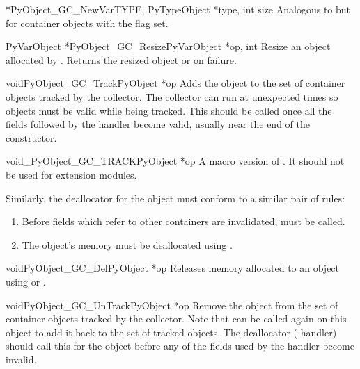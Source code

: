 \begin{cfuncdesc}{*}{PyObject_GC_NewVar}{TYPE, PyTypeObject *type,
                                                   int size}
  Analogous to  but for container objects
  with the  flag set.
\end{cfuncdesc}

\begin{cfuncdesc}{PyVarObject *}{PyObject_GC_Resize}{PyVarObject *op, int}
  Resize an object allocated by .  Returns
  the resized object or \NULL{} on failure.
\end{cfuncdesc}

\begin{cfuncdesc}{void}{PyObject_GC_Track}{PyObject *op}
  Adds the object  to the set of container objects tracked by
  the collector.  The collector can run at unexpected times so objects
  must be valid while being tracked.  This should be called once all
  the fields followed by the  handler become valid,
  usually near the end of the constructor.
\end{cfuncdesc}

\begin{cfuncdesc}{void}{_PyObject_GC_TRACK}{PyObject *op}
  A macro version of .  It should not be
  used for extension modules.
\end{cfuncdesc}

Similarly, the deallocator for the object must conform to a similar
pair of rules:

\begin{enumerate}
\item  Before fields which refer to other containers are invalidated,
        must be called.

\item  The object's memory must be deallocated using
       .
\end{enumerate}

\begin{cfuncdesc}{void}{PyObject_GC_Del}{PyObject *op}
  Releases memory allocated to an object using
   or .
\end{cfuncdesc}

\begin{cfuncdesc}{void}{PyObject_GC_UnTrack}{PyObject *op}
  Remove the object  from the set of container objects tracked
  by the collector.  Note that  can be
  called again on this object to add it back to the set of tracked
  objects.  The deallocator ( handler) should call
  this for the object before any of the fields used by the
   handler become invalid.
\end{cfuncdesc}


